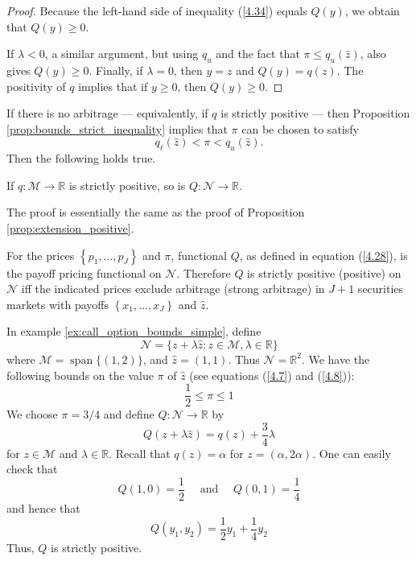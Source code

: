 \documentclass[\topdir/lecture\_notes.tex]{subfiles}
\begin{document}
\begin{optional}
\begin{proof}
Because the left-hand side of inequality (\ref{4.34}) equals \(Q(y)\), we obtain that \(Q(y) \geq 0\).

If \(\lambda<0\), a similar argument, but using \(q_{u}\) and the fact that \(\pi \leq q_{u}(\hat{z})\), also gives \(Q(y) \geq 0\). Finally, if \(\lambda=0\), then \(y=z\) and \(Q(y)=q(z)\). The positivity of \(q\) implies that if \(y \geq 0\), then \(Q(y) \geq 0\).
\end{proof}
If there is no arbitrage --- equivalently, if \(q\) is strictly positive --- then Proposition \ref{prop:bounds_strict_inequality} implies that \(\pi\) can be chosen to satisfy
\begin{equation*}
q_{\ell}(\hat{z})<\pi<q_{u}(\hat{z}) . 
\end{equation*}
Then the following holds true.
\begin{proposition} \label{prop:extension_strictly_positive}If \(q: \mathcal{M} \rightarrow \mathbb{R}\) is strictly positive, so is \(Q: \mathcal{N} \rightarrow \mathbb{R}\).
\end{proposition}
The proof is essentially the same as the proof of Proposition \ref{prop:extension_positive}.

For the prices \(\left\{p_{1}, \ldots, p_{J}\right\}\) and \(\pi\), functional \(Q\), as defined in equation (\ref{4.28}), is the payoff pricing functional on \(\mathcal{N}\). Therefore \(Q\) is strictly positive (positive) on \(\mathcal{N}\) iff the indicated prices exclude arbitrage (strong arbitrage) in \(J+1\) securities markets with payoffs \(\left\{x_{1}, \ldots, x_{J}\right\}\) and \(\hat{z}\).
\begin{example}\label{ex:extension_example}
In example \ref{ex:call_option_bounds_simple}, define
\begin{equation*}
\mathcal{N}=\{z+\lambda \hat{z}: z \in \mathcal{M}, \lambda \in \mathbb{R}\} 
\end{equation*}
where \(\mathcal{M}=\operatorname{span}\{(1,2)\}\), and \(\hat{z}=(1,1)\). Thus \(\mathcal{N}=\mathbb{R}^{2}\). We have the following bounds on the value \(\pi\) of \(\hat{z}\) (see equations (\ref{4.7}) and (\ref{4.8})):
\begin{equation*}
\frac{1}{2} \leq \pi \leq 1 
\end{equation*}
We choose \(\pi=3 / 4\) and define \(Q: \mathcal{N} \rightarrow \mathbb{R}\) by
\begin{equation*}
Q(z+\lambda \hat{z})=q(z)+\frac{3}{4} \lambda 
\end{equation*}
for \(z \in \mathcal{M}\) and \(\lambda \in \mathbb{R}\). Recall that \(q(z)=\alpha\) for \(z=(\alpha, 2 \alpha)\). One can easily check that
\begin{equation*}
Q(1,0)=\frac{1}{2} \quad \text { and } \quad Q(0,1)=\frac{1}{4} 
\end{equation*}
and hence that
\begin{equation*}
Q\left(y_{1}, y_{2}\right)=\frac{1}{2} y_{1}+\frac{1}{4} y_{2} 
\end{equation*}
Thus, \(Q\) is strictly positive.
\end{example}
\end{optional}
\end{document}
